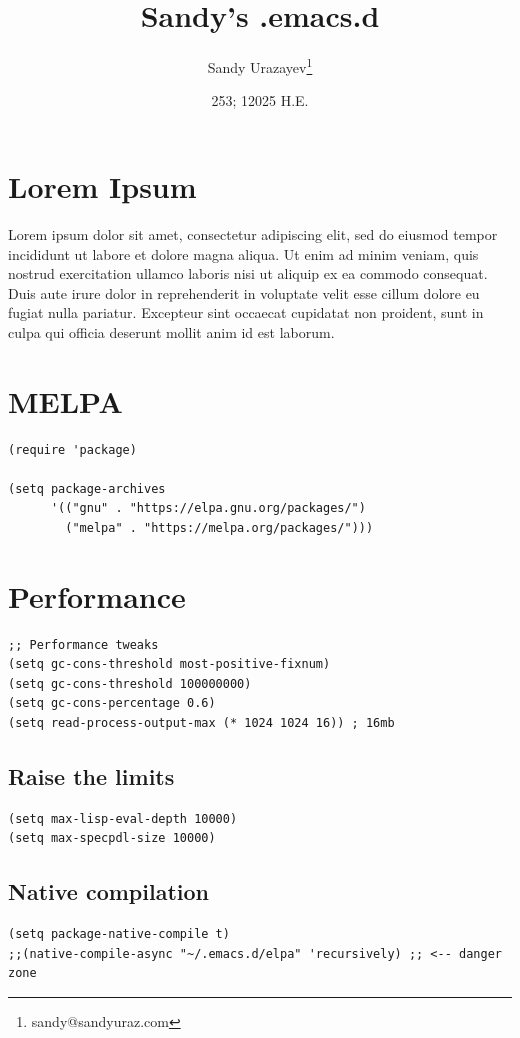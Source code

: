 \documentclass[10pt]{article}
\author{Sandy Urazayev\thanks{sandy@sandyuraz.com}}
\date{253; 12025 H.E.}
\title{Sandy's .emacs.d}
\begin{document}
\maketitle
\section{Lorem Ipsum}
\label{sec:orgf3feaad}
Lorem ipsum dolor sit amet, consectetur adipiscing elit, sed do eiusmod tempor
incididunt ut labore et dolore magna aliqua. Ut enim ad minim veniam, quis
nostrud exercitation ullamco laboris nisi ut aliquip ex ea commodo
consequat. Duis aute irure dolor in reprehenderit in voluptate velit esse cillum
dolore eu fugiat nulla pariatur. Excepteur sint occaecat cupidatat non proident,
sunt in culpa qui officia deserunt mollit anim id est laborum.
\section{MELPA}
\label{sec:org80f95be}
\begin{verbatim}
(require 'package)

(setq package-archives
      '(("gnu" . "https://elpa.gnu.org/packages/")
        ("melpa" . "https://melpa.org/packages/")))
\end{verbatim}
\section{Performance}
\label{sec:orgce00890}
\begin{verbatim}
;; Performance tweaks
(setq gc-cons-threshold most-positive-fixnum)
(setq gc-cons-threshold 100000000)
(setq gc-cons-percentage 0.6)
(setq read-process-output-max (* 1024 1024 16)) ; 16mb
\end{verbatim}
\subsection{Raise the limits}
\label{sec:orgaa8b98a}
\begin{verbatim}
(setq max-lisp-eval-depth 10000)
(setq max-specpdl-size 10000)
\end{verbatim}
\subsection{Native compilation}
\label{sec:orgbd6db56}
\begin{verbatim}
(setq package-native-compile t)
;;(native-compile-async "~/.emacs.d/elpa" 'recursively) ;; <-- danger zone
\end{verbatim}
\end{document}
